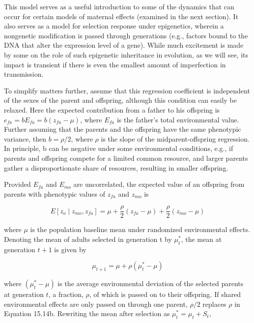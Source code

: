 \documentclass{article}
\begin{document}
This model serves as a useful introduction to some of the dynamics that can occur for certain models of maternal effects (examined in the next section). It also serves as a model for selection response under epigenetics, wherein a nongenetic modification is passed through generations (e.g., factors bound to the DNA that alter the expression level of a gene). While much excitement is made by some on the role of such epigenetic inheritance in evolution, as we will see, its impact is transient if there is even the smallest amount of imperfection in transmission.

To simplify matters further, assume that this regression coefficient is independent of the sexes of the parent and offspring, although this condition can easily be relaxed. Here the expected contribution from a father to his offspring is  $ e_{fa} = bE_{fa} = b(z_{fa} - \mu) $, where  $ E_{fa} $ is the father's total environmental value. Further assuming that the parents and the offspring have the same phenotypic variance, then  $ b = \rho/2 $, where  $ \rho $ is the slope of the midparent-offspring regression. In principle, b can be negative under some environmental conditions, e.g., if parents and offspring compete for a limited common resource, and larger parents gather a disproportionate share of resources, resulting in smaller offspring.

Provided  $ E_{fa} $ and  $ E_{mo} $ are uncorrelated, the expected value of an offspring from parents with phenotypic values of  $ z_{fa} $ and  $ z_{mo} $ is

\begin{equation}
E\left[z_{o}\mid z_{m o},z_{f a}\right]=\mu+\frac{\rho}{2}\left(z_{f a}-\mu\right)+\frac{\rho}{2}\left(z_{m o}-\mu\right)
\tag{15.14a}
\label{eq:15_14a}
\end{equation}

where  $ \mu $ is the population baseline mean under randomized environmental effects. Denoting the mean of adults selected in generation t by  $ \mu_{t}^{*} $, the mean at generation  $ t+1 $ is given by

\begin{equation}
\mu_{t+1}=\mu+\rho\left(\mu_{t}^{*}-\mu\right)
\tag{15.14b}
\label{eq:15_14b}
\end{equation}

where  $ (\mu_t^* - \mu) $ is the average environmental deviation of the selected parents at generation  $ t $, a fraction,  $ \rho $, of which is passed on to their offspring. If shared environmental effects are only passed on through one parent,  $ \rho/2 $ replaces  $ \rho $ in Equation 15.14b. Rewriting the mean after selection as  $ \mu_t^* = \mu_t + S_t $,
\end{document}
